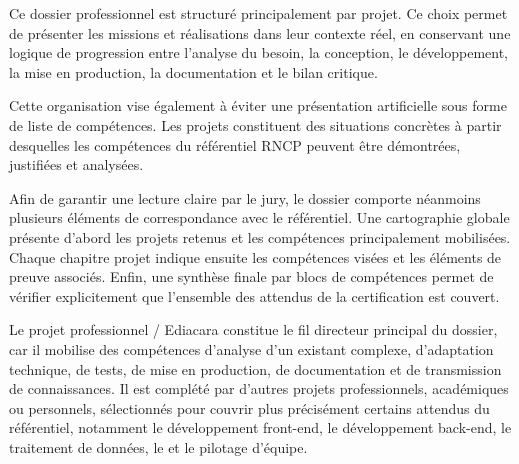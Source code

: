 Ce dossier professionnel est structuré principalement par projet. Ce choix permet de présenter les missions et réalisations dans leur contexte réel, en conservant une logique de progression entre l'analyse du besoin, la conception, le développement, la mise en production, la documentation et le bilan critique.

Cette organisation vise également à éviter une présentation artificielle sous forme de liste de compétences. Les projets constituent des situations concrètes à partir desquelles les compétences du référentiel RNCP peuvent être démontrées, justifiées et analysées.

Afin de garantir une lecture claire par le jury, le dossier comporte néanmoins plusieurs éléments de correspondance avec le référentiel. Une cartographie globale présente d'abord les projets retenus et les compétences principalement mobilisées. Chaque chapitre projet indique ensuite les compétences visées et les éléments de preuve associés. Enfin, une synthèse finale par blocs de compétences permet de vérifier explicitement que l'ensemble des attendus de la certification est couvert.

Le projet professionnel  / Ediacara constitue le fil directeur principal du dossier, car il mobilise des compétences d'analyse d'un existant complexe, d'adaptation technique, de tests, de mise en production, de documentation et de transmission de connaissances. Il est complété par d'autres projets professionnels, académiques ou personnels, sélectionnés pour couvrir plus précisément certains attendus du référentiel, notamment le développement front-end, le développement back-end, le traitement de données, le  et le pilotage d'équipe.
